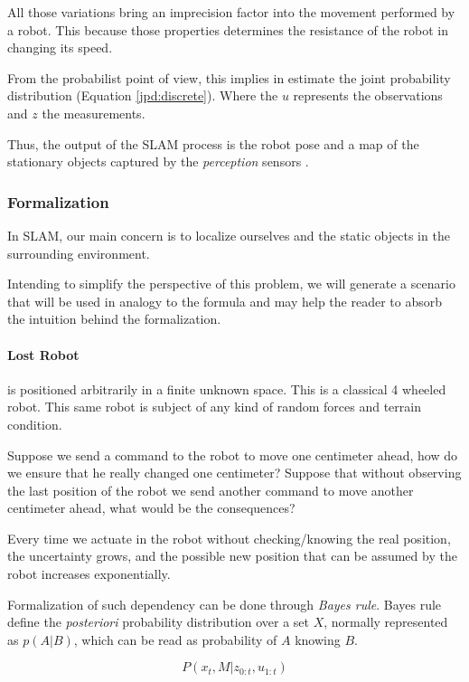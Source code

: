 All those variations bring an imprecision factor into the movement performed by a robot. This because those properties determines the resistance of the robot in changing its speed.

From the probabilist point of view, this implies in estimate the joint probability distribution (Equation \ref{jpd:discrete}). Where the $u$ represents the observations and $z$ the measurements.

Thus, the output of the SLAM process is the robot pose and a map of the stationary objects captured by the \textit{perception} sensors \cite{iyengar1991autonomous}.

\subsubsection{Formalization}

In SLAM, our main concern is to localize ourselves and the static objects in the surrounding environment. 

Intending to simplify the perspective of this problem, we will generate a scenario that will be used in analogy to the formula and may help the reader to absorb the intuition behind the formalization.

\paragraph*{Lost Robot} is positioned arbitrarily in a finite unknown space. This is a classical 4 wheeled robot. This same robot is subject of any kind of random forces and terrain condition. 

Suppose we send a command to the robot to move one centimeter ahead, how do we ensure that he really changed one centimeter? Suppose that without observing the last position of the robot we send another command to move another centimeter ahead, what would be the consequences? 

Every time we actuate in the robot without checking/knowing the real position, the uncertainty grows, and the possible new position that can be assumed by the robot increases exponentially.

Formalization of such dependency can be done through \textit{Bayes rule}. Bayes rule define the \textit{posteriori} probability distribution over a set $X$, normally represented as $p(A | B)$, which can be read as probability of $A$ knowing $B$.

\begin{equation}
\label{jpd:discrete}
P(x_t,M | z_{0:t}, u_{1:t})
\end{equation}

